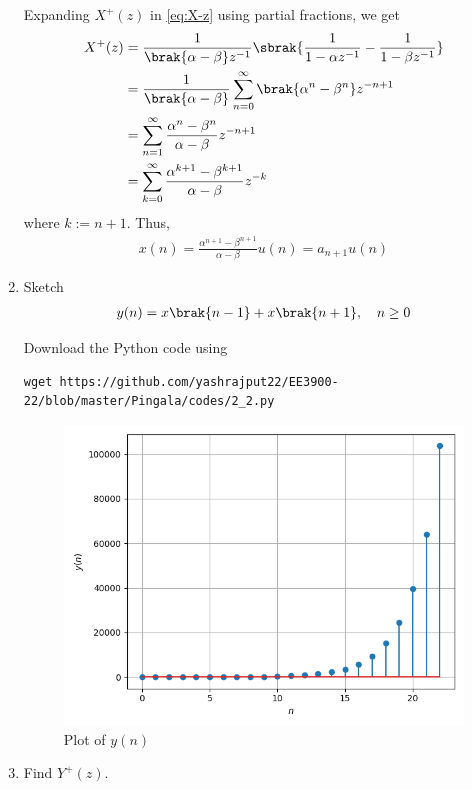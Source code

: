 \documentclass[journal,12pt,twocolumn]{IEEEtran}
\renewcommand\thesection{\arabic{section}}
\begin{document}
\begin{enumerate}[label=\thesection.\arabic*,ref=\thesection.\theenumi]
\solution Expanding $X^+(z)$ in \eqref{eq:X-z} using partial fractions, we get
\begin{align}
    X^+(z) &= \frac{1}{\brak{\alpha - \beta}z^{-1}}\sbrak{\frac{1}{1 - \alpha z^{-1}} - \frac{1}{1 - \beta z^{-1}}} \\
           &= \frac{1}{\brak{\alpha - \beta}}\sum_{n = 0}^{\infty}\brak{\alpha^n - \beta^n}z^{-n + 1} \\
           &= \sum_{n = 1}^{\infty}\frac{\alpha^{n} - \beta^{n}}{\alpha - \beta}z^{-n + 1} \\
           &= \sum_{k = 0}^{\infty}\frac{\alpha^{k + 1} - \beta^{k + 1}}{\alpha - \beta}z^{-k}
\end{align}
where $k := n + 1$. Thus,
\begin{align}
    x(n) = \frac{\alpha^{n + 1} - \beta^{n + 1}}{\alpha - \beta}u(n) = a_{n + 1}u(n)
    \label{eq:x-n-def}
\end{align}
	\item Sketch 
\begin{align}
	y(n) = x\brak{n-1} + x\brak{n+1},  \quad n \ge 0
	\label{eq:10-orig-diff-rev}
\end{align}

\solution
Download the Python code using
\begin{lstlisting}
wget https://github.com/yashrajput22/EE3900-22/blob/master/Pingala/codes/2_2.py
\end{lstlisting}
\begin{figure}[!htbp]
    \includegraphics[width=\columnwidth]{figs/2_2.png}
    \caption{Plot of $y(n)$}
    \label{fig:yn}
\end{figure}
\item Find $Y^{+}(z)$. 


\end{enumerate}
\end{document}
